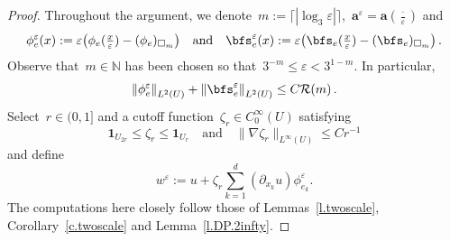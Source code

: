 \documentclass[11pt,twoside]{article} %
\let\oldsquare\square %
\renewcommand{\square}{\oldsquare}
\numberwithin{equation}{section}
\theoremstyle{definition}
\let\originalleft\left
\let\originalright\right
\renewcommand{\left}{\mathopen{}\mathclose\bgroup\originalleft}
\renewcommand{\right}{\aftergroup\egroup\originalright}
\newcommand*{\N}{\ensuremath{\mathbb{N}}}
\newcommand{\eps}{\varepsilon}
\newcommand{\ep}{\eps}
\renewcommand{\a}{\mathbf{a}}
\newcommand{\cu}{\square}
\newcommand{\indc}{\boldsymbol{1}}
\begin{document}
\begin{proof}
Throughout the argument, we denote~$m:= \lceil |\log_3 \ep| \rceil$,~$\a^\ep =  \a(\tfrac \cdot\ep)$ and
\begin{align*}
\phi_{e}^\ep (x) : = \ep \bigl(  \phi_{e}(\tfrac x\ep) - ( \phi_{e} )_{\cu_m} \bigr)
\quad \mbox{and} \quad
\bfs_{e}^\ep(x) := \ep \bigl( \bfs_{e}(\tfrac x\ep) - ( \bfs_{e} )_{\cu_m} \bigr)
\,.
\end{align*}
Observe that~$m\in\N$ has been chosen so that~$3^{-m} \leq \ep < 3^{1-m}$. In particular, 
\begin{align*}
\left\| \phi_e^\ep \right\|_{L^2(U)} + \left\| \bfs_e^\ep \right\|_{L^2(U)} 
\leq C\mathcal{R}(m)
\,.
\end{align*}
Select~$r\in (0,1]$ and a cutoff function~$\zeta_r \in C_0^\infty(U)$ satisfying
\begin{equation}
\label{e.zetar.cut.off}
\indc_{U_{2r}} \leq \zeta_r \leq \indc_{U_{r}}
\quad \mbox{and} \quad 
\| \nabla \zeta_r \|_{L^\infty(U)} \leq C r^{-1}
\end{equation}
and define
\begin{equation}
\label{e.wepdef}
w^\ep  :=
u +  \zeta_r \sum_{k=1}^d (\partial_{x_k}u) \phi_{e_k}^\ep .
\end{equation}
The computations here closely follow those of Lemmas~\ref{l.twoscale}, Corollary~\ref{c.twoscale} and Lemma~\ref{l.DP.2infty}. 

\smallskip


\end{proof}
\end{document}

